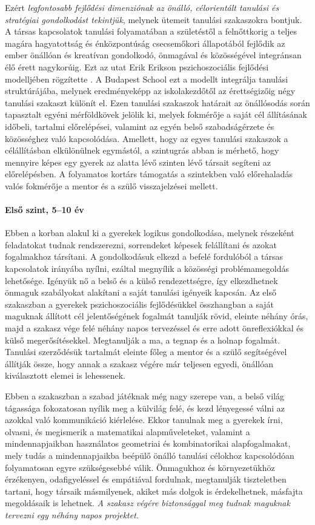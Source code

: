\begin{spacing}{0.99}
Ezért \emph{legfontosabb fejlődési dimenziónak az önálló, célorientált tanulási és stratégiai gondolkodást tekintjük}, melynek ütemeit tanulási szakaszokra bontjuk. A társas kapcsolatok tanulási folyamatában a születéstől a felnőttkorig a teljes magára hagyatottság és énközpontúság csecsemőkori állapotából fejlődik az ember önállóan és kreatívan gondolkodó, önmagával és közösségével integránsan élő érett nagykorúig. Ezt az utat Erik Erikson pszichoszociális fejlődési modelljében rögzítette \citep{Erikson91}. A Budapest School ezt a modellt integrálja tanulási struktúrájába, melynek eredményeképp az iskolakezdőtől az érettségizőig négy tanulási szakaszt különít el. Ezen tanulási szakaszok határait az önállósodás során tapasztalt egyéni mérföldkövek jelölik ki, melyek fokmérője a saját cél állításának időbeli, tartalmi előrelépései, valamint az egyén belső szabadságérzete és közösséghez való kapcsolódása. Amellett, hogy az egyes tanulási szakaszok  a célállításban elkülönülnek egymástól, a szintugrás abban is mérhető, hogy mennyire képes egy gyerek az alatta lévő szinten lévő társait segíteni az előrelépésben. A folyamatos kortárs támogatás a szintekben való előrehaladás valós fokmérője a mentor és a szülő visszajelzései mellett.

\paragraph{Első szint, 5--10 év }

Ebben a korban alakul ki a gyerekek logikus gondolkodása, melynek részeként feladatokat tudnak rendszerezni, sorrendeket képesek felállítani és azokat fogalmakhoz társítani. A gondolkodásuk elkezd a befelé fordulóból a társas kapcsolatok irányába nyílni, ezáltal megnyílik a közösségi problémamegoldás lehetősége. Igényük nő a belső és a külső rendezettségre, így elkezdhetnek önmaguk szabályokat alakítani a saját tanulási igényeik kapcsán. Az első szakaszban a gyerekek pszichoszociális fejlődésükkel összhangban a saját maguknak állított cél jelentőségének fogalmát tanulják rövid, eleinte néhány órás, majd a szakasz vége felé néhány napos tervezéssel és erre adott önreflexiókkal és külső megerősítésekkel.  Megtanulják a ma, a tegnap és a holnap fogalmát. Tanulási szerződésük tartalmát eleinte főleg a mentor és a szülő segítségével állítják össze, hogy annak a szakasz végére már teljesen egyedi, önállóan kiválasztott elemei is lehessenek.

Ebben a szakaszban a szabad játéknak még nagy szerepe van, a belső világ tágassága fokozatosan nyílik meg a külvilág felé, és kezd lényegessé válni az azokkal való kommunikáció kiérlelése. Ekkor tanulnak meg a gyerekek írni, olvasni, és megismerik a matematikai alapműveleteket, valamint a mindennapjaikban használatos  geometriai és kombinatorikai alapfogalmakat, mely tudás a mindennapjaikba beépülő önálló tanulási célokhoz kapcsolódóan folyamatosan egyre szükségesebbé válik. Önmagukhoz és környezetükhöz érzékenyen, odafigyeléssel és empátiával fordulnak, megtanulják tiszteletben tartani, hogy társaik másmilyenek, akiket más dolgok is érdekelhetnek, másfajta megoldásaik is lehetnek. \emph{A szakasz végére biztonsággal meg tudnak maguknak tervezni egy néhány napos projektet.}\vfill\eject


\end{spacing}

